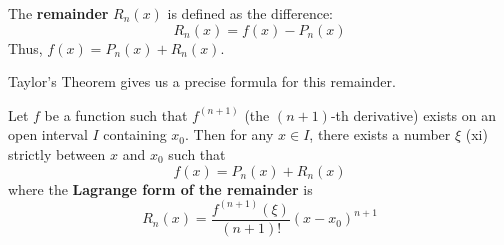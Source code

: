 \begin{definition}[Remainder]
The \textbf{remainder} $R_n(x)$ is defined as the difference:
\[
R_n(x) = f(x) - P_n(x)
\]
Thus, $f(x) = P_n(x) + R_n(x)$.
\end{definition}

Taylor's Theorem gives us a precise formula for this remainder.

\newpage

\begin{theorem}
\label{thm:taylor_en}
Let $f$ be a function such that $f^{(n+1)}$ (the $(n+1)$-th derivative) exists on an open interval $I$ containing $x_0$.
Then for any $x \in I$, there exists a number $\xi$ (xi) strictly between $x$ and $x_0$ such that
\[
f(x) = P_n(x) + R_n(x)
\]
where the \textbf{Lagrange form of the remainder} is
\[
R_n(x) = \frac{f^{(n+1)}(\xi)}{(n+1)!} (x-x_0)^{n+1}
\]
\end{theorem}

